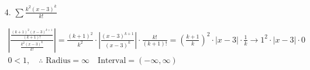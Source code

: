 \begin{itemize}
        \item[4.] $\sum\frac{k^{2}(x-3)^{k}}{k!}$
        \\
        \begin{mdframed}
            \begin{equation*}
                \begin{gathered}
                    \left|\frac {\frac{(k+1)^{2}(x-3)^{k+1}}{(k+1)!}}
                                {\frac{k^{2}(x-3)^{k}}{k!}}\right| =
                            \frac{(k+1)^{2}}{k^{2}}\cdot
                            \left|\frac{(x-3)^{k+1}}{(x-3)^{k}}\right|\cdot
                            \frac{k!}{(k+1)!} =
                            \left(\frac{k+1}{k}\right)^{2}\cdot
                            |x-3|\cdot
                            \frac{1}{k} \rightarrow
                            1^{2} \cdot |x-3| \cdot 0   \\
                            0 < 1, \quad 
                            \therefore \text{ Radius} = \infty \quad
                            \text{Interval} = \left(-\infty, \infty\right)
                \end{gathered}
            \end{equation*}
        \end{mdframed}
    \end{itemize}
